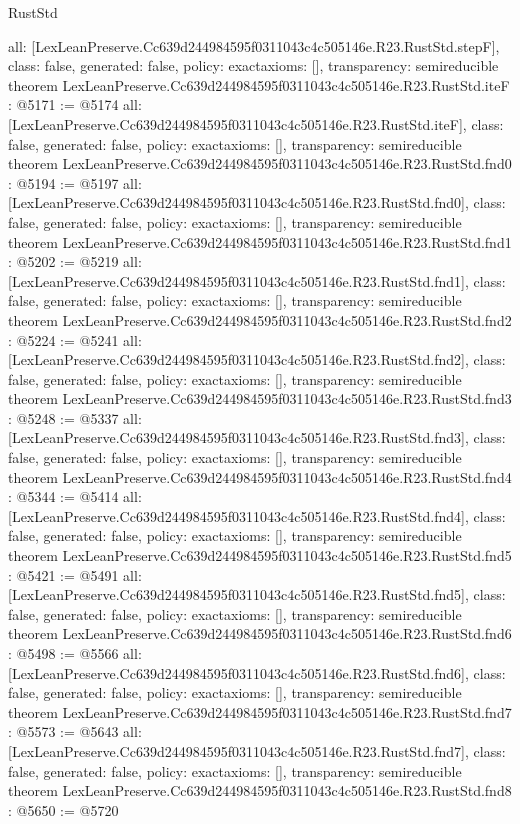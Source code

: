 \begin{lexlean}{RustStd}
\begin{coremodule}
{  all: [LexLeanPreserve.Cc639d244984595f0311043c4c505146e.R23.RustStd.stepF],
  class: false,
  generated: false,
  policy: exact{axioms: []},
  transparency: semireducible
}
theorem LexLeanPreserve.Cc639d244984595f0311043c4c505146e.R23.RustStd.iteF : @5171 := @5174 {
  all: [LexLeanPreserve.Cc639d244984595f0311043c4c505146e.R23.RustStd.iteF],
  class: false,
  generated: false,
  policy: exact{axioms: []},
  transparency: semireducible
}
theorem LexLeanPreserve.Cc639d244984595f0311043c4c505146e.R23.RustStd.fnd0 : @5194 := @5197 {
  all: [LexLeanPreserve.Cc639d244984595f0311043c4c505146e.R23.RustStd.fnd0],
  class: false,
  generated: false,
  policy: exact{axioms: []},
  transparency: semireducible
}
theorem LexLeanPreserve.Cc639d244984595f0311043c4c505146e.R23.RustStd.fnd1 : @5202 := @5219 {
  all: [LexLeanPreserve.Cc639d244984595f0311043c4c505146e.R23.RustStd.fnd1],
  class: false,
  generated: false,
  policy: exact{axioms: []},
  transparency: semireducible
}
theorem LexLeanPreserve.Cc639d244984595f0311043c4c505146e.R23.RustStd.fnd2 : @5224 := @5241 {
  all: [LexLeanPreserve.Cc639d244984595f0311043c4c505146e.R23.RustStd.fnd2],
  class: false,
  generated: false,
  policy: exact{axioms: []},
  transparency: semireducible
}
theorem LexLeanPreserve.Cc639d244984595f0311043c4c505146e.R23.RustStd.fnd3 : @5248 := @5337 {
  all: [LexLeanPreserve.Cc639d244984595f0311043c4c505146e.R23.RustStd.fnd3],
  class: false,
  generated: false,
  policy: exact{axioms: []},
  transparency: semireducible
}
theorem LexLeanPreserve.Cc639d244984595f0311043c4c505146e.R23.RustStd.fnd4 : @5344 := @5414 {
  all: [LexLeanPreserve.Cc639d244984595f0311043c4c505146e.R23.RustStd.fnd4],
  class: false,
  generated: false,
  policy: exact{axioms: []},
  transparency: semireducible
}
theorem LexLeanPreserve.Cc639d244984595f0311043c4c505146e.R23.RustStd.fnd5 : @5421 := @5491 {
  all: [LexLeanPreserve.Cc639d244984595f0311043c4c505146e.R23.RustStd.fnd5],
  class: false,
  generated: false,
  policy: exact{axioms: []},
  transparency: semireducible
}
theorem LexLeanPreserve.Cc639d244984595f0311043c4c505146e.R23.RustStd.fnd6 : @5498 := @5566 {
  all: [LexLeanPreserve.Cc639d244984595f0311043c4c505146e.R23.RustStd.fnd6],
  class: false,
  generated: false,
  policy: exact{axioms: []},
  transparency: semireducible
}
theorem LexLeanPreserve.Cc639d244984595f0311043c4c505146e.R23.RustStd.fnd7 : @5573 := @5643 {
  all: [LexLeanPreserve.Cc639d244984595f0311043c4c505146e.R23.RustStd.fnd7],
  class: false,
  generated: false,
  policy: exact{axioms: []},
  transparency: semireducible
}
theorem LexLeanPreserve.Cc639d244984595f0311043c4c505146e.R23.RustStd.fnd8 : @5650 := @5720 {
}
\end{coremodule}
\end{lexlean}
